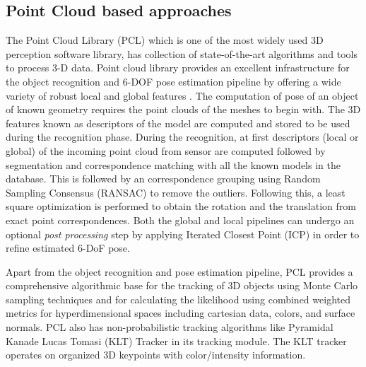 \subsection{Point Cloud based approaches}
\label{ssec:pcl}
The Point Cloud Library (PCL) \cite{rusu20113d} which is one of the most widely used 3D perception software library, has collection of state-of-the-art algorithms and tools to process 3-D data. Point cloud library provides an excellent infrastructure for the object recognition and 6-DOF pose estimation pipeline by offering a wide variety of robust local and global features \cite{aldoma2012point}. 
The computation of pose of an object of known geometry requires the point clouds of the meshes to begin with. The 3D features known as descriptors of the model are computed and stored to be used during the recognition phase.  During the recognition, at first descriptors (local or global) of the incoming point cloud from sensor are computed followed by segmentation and correspondence matching with all the known models in the database. This is followed by an correspondence grouping using Random Sampling Consensus (RANSAC) to remove the outliers. Following this, a least square optimization is performed to obtain the rotation and the translation from exact point correspondences. Both the global and local pipelines can undergo an optional \emph{post processing} step by applying Iterated Closest Point (ICP) in order to refine estimated 6-DoF pose.

Apart from the object recognition and pose estimation pipeline, PCL provides a comprehensive algorithmic base for the tracking of 3D objects using Monte Carlo sampling techniques \cite{RUeda2012} and for calculating the likelihood using combined weighted metrics for hyperdimensional spaces including cartesian data, colors, and surface normals. PCL also has non-probabilistic tracking algorithms like Pyramidal Kanade Lucas Tomasi (KLT) Tracker in its tracking module. The KLT tracker operates on organized 3D keypoints with color/intensity information.
